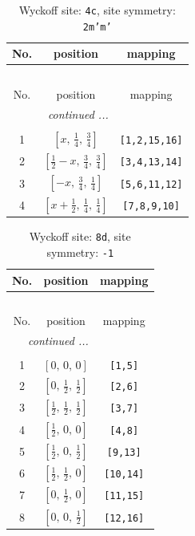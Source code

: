 \documentclass[fleqn,8pt]{jsarticle}
\begin{document}
\renewcommand{\arraystretch}{1.2}
\begin{longtable}{ccc}
\caption{Wyckoff site: {\tt 4c}, site symmetry: {\tt 2m'm'}}
 \\
 \hline \hline
No. & position & mapping \\ \hline \endfirsthead

\multicolumn{2}{l}{\tablename\ \thetable{}} \\
 \hline \hline
No. & position & mapping \\ \hline \endhead

 \hline \hline
\multicolumn{2}{r}{\footnotesize\it continued ...} \\ \endfoot

 \hline \hline
\multicolumn{2}{r}{} \\ \endlastfoot

1 & $\left[ x,\, \frac{1}{4},\, \frac{3}{4} \right]$ & {\tt [1,2,15,16]} \\ \hline
2 & $\left[ \frac{1}{2} - x,\, \frac{3}{4},\, \frac{3}{4} \right]$ & {\tt [3,4,13,14]} \\ \hline
3 & $\left[ - x,\, \frac{3}{4},\, \frac{1}{4} \right]$ & {\tt [5,6,11,12]} \\ \hline
4 & $\left[ x + \frac{1}{2},\, \frac{1}{4},\, \frac{1}{4} \right]$ & {\tt [7,8,9,10]} \\
\end{longtable}
\renewcommand{\arraystretch}{1.2}
\begin{longtable}{ccc}
\caption{Wyckoff site: {\tt 8d}, site symmetry: {\tt -1}}
 \\
 \hline \hline
No. & position & mapping \\ \hline \endfirsthead

\multicolumn{2}{l}{\tablename\ \thetable{}} \\
 \hline \hline
No. & position & mapping \\ \hline \endhead

 \hline \hline
\multicolumn{2}{r}{\footnotesize\it continued ...} \\ \endfoot

 \hline \hline
\multicolumn{2}{r}{} \\ \endlastfoot

1 & $\left[ 0,\, 0,\, 0 \right]$ & {\tt [1,5]} \\ \hline
2 & $\left[ 0,\, \frac{1}{2},\, \frac{1}{2} \right]$ & {\tt [2,6]} \\ \hline
3 & $\left[ \frac{1}{2},\, \frac{1}{2},\, \frac{1}{2} \right]$ & {\tt [3,7]} \\ \hline
4 & $\left[ \frac{1}{2},\, 0,\, 0 \right]$ & {\tt [4,8]} \\ \hline
5 & $\left[ \frac{1}{2},\, 0,\, \frac{1}{2} \right]$ & {\tt [9,13]} \\ \hline
6 & $\left[ \frac{1}{2},\, \frac{1}{2},\, 0 \right]$ & {\tt [10,14]} \\ \hline
7 & $\left[ 0,\, \frac{1}{2},\, 0 \right]$ & {\tt [11,15]} \\ \hline
8 & $\left[ 0,\, 0,\, \frac{1}{2} \right]$ & {\tt [12,16]} \\
\end{longtable}
\end{document}
